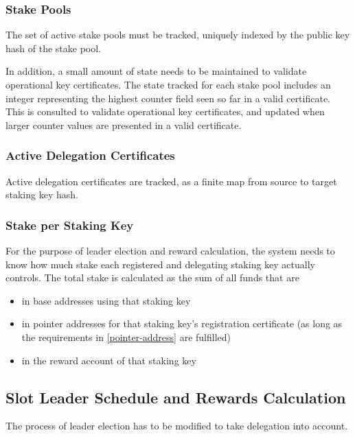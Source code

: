 \documentclass[11pt,a4paper,dvipsnames,twosided]{article}
\begin{document}
\subsubsection{Stake Pools}
\label{stake-pools}

The set of active stake pools must be tracked, uniquely indexed
by the public key hash of the stake pool.

In addition, a small amount of state needs to be maintained to validate
operational key certificates. The state tracked for each stake pool includes
an integer representing the highest counter field seen so far in a valid
certificate. This is consulted to validate operational key certificates, and
updated when larger counter values are presented in a valid certificate.

\subsubsection{Active Delegation Certificates}
\label{active-delegation-certificates}

Active delegation certificates are tracked, as a finite map from
source to target staking key hash.

\subsubsection{Stake per Staking Key}
\label{stake-per-staking-key}

For the purpose of leader election and reward calculation, the system
needs to know how much stake each registered and delegating staking key
actually controls. The total stake is calculated as the sum of all
funds that are
\begin{itemize}
\item in base addresses using that staking key
\item in pointer addresses for that staking key's registration
  certificate (as long as the requirements in \cref{pointer-address} are
  fulfilled)
\item in the reward account of that staking key
\end{itemize}

\subsection{Slot Leader Schedule and Rewards Calculation}
\label{slot-leader-schedule}

The process of leader election has to be modified to take delegation
into account.
\end{document}
